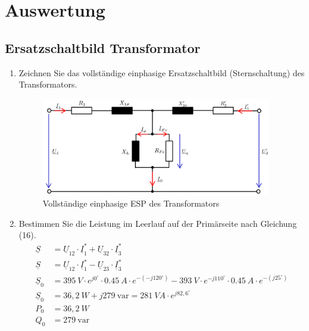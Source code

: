 \section{Auswertung}
\subsection{Ersatzschaltbild Transformator}
\begin{enumerate}[label=\alph*)]
	\item Zeichnen Sie das vollständige einphasige Ersatzschaltbild (Sternschaltung) des
	      Transformators.
	      \begin{figure}[h!]
		      \begin{center}
			      \includegraphics[width=0.95\textwidth]{img/4.1.1.1}
		      \end{center}
		      \caption{Vollständige einphasige ESP des Transformators}\label{img:2.1.1.1}
	      \end{figure}

	\item Bestimmen Sie die Leistung im Leerlauf auf der Primärseite nach Gleichung (16).
	      \begin{align*}
		      \underline S   & = \underline U_{12} \cdot \underline I_1^* + \underline U_{32}\cdot \underline I_3^* \\
		      \underline S   & = \underline U_{12} \cdot \underline I_1^* - \underline U_{23}\cdot \underline I_3^* \\
		      \underline S_0 & = 395\ V \cdot e^{j0^\circ} \cdot 0.45\ A \cdot e^{-(-j120^\circ)} -
		      393\ V \cdot e^{-j110^\circ}\cdot 0.45\ A \cdot e^{-(j25^\circ)}                                      \\
		      \underline S_0 & = 36,2\ W + j279\ \text{var} = 281\ VA\cdot e^{j82,6^\circ}                          \\
		      P_0            & = 36,2\ W                                                                            \\
		      Q_0            & = 279\ \text{var}
	      \end{align*}


\end{enumerate}
